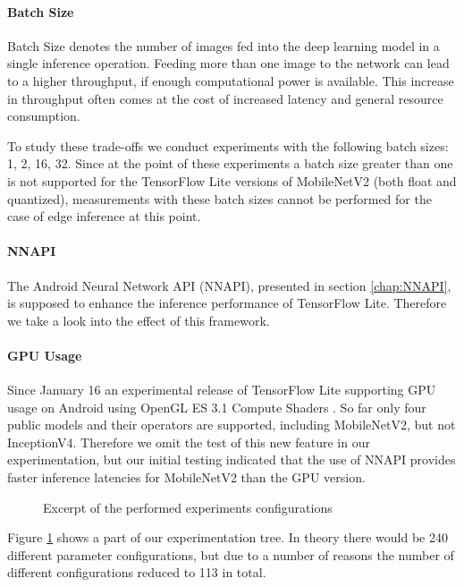 \paragraph{Batch Size}
Batch Size denotes the number of images fed into the deep learning model in a single inference operation. 
Feeding more than one image to the network can lead to a higher throughput, if enough computational power is available. This increase in throughput often comes at the cost of increased latency and general resource consumption.

To study these trade-offs we conduct experiments with the following batch sizes: 1, 2, 16, 32. Since at the point of these experiments a batch size greater than one is not supported for the TensorFlow Lite versions of MobileNetV2 (both float and quantized), measurements with these batch sizes cannot be performed for the case of edge inference at this point.
\paragraph{NNAPI}
The Android Neural Network API (NNAPI), presented in section \ref{chap:NNAPI}, is supposed to enhance the inference performance of TensorFlow Lite. Therefore we take a look into the effect of this framework.
\paragraph{GPU Usage}
Since January 16 an experimental release of TensorFlow Lite supporting GPU usage on Android using OpenGL ES 3.1 Compute Shaders \cite{tfLiteGPU}.
So far only four public models and their operators are supported, including MobileNetV2, but not InceptionV4. 
Therefore we omit the test of this new feature in our experimentation, but our initial testing indicated that the use of NNAPI provides faster inference latencies for MobileNetV2 than the GPU version.


\begin{figure}[!htb]
\centering
 \scalebox{.7}{}

\caption{Excerpt of the performed experiments configurations}
\label{fig:tree}
\end{figure}



Figure \ref{fig:tree} shows a part of our experimentation tree. In theory there would be 240 different parameter configurations, but due to a number of reasons the number of different configurations reduced to 113 in total.

